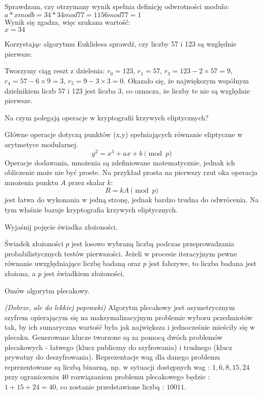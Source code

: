 \documentclass[answers,11pt]{exam}
\newcommand{\fixit}{\textit{(Dobrze, ale do lekkiej poprawki)} }
\begin{document}
\begin{questions}
\begin{solution}
Sprawdzam, czy otrzymany wynik spełnia definicję odwrotności modulo:\\
$a * x mod b = 34 * 34 mod 77 = 1156 mod 77 = 1$\\

Wynik się zgadza, więc szukana wartość:\\
$x = 34$
\end{solution}

\question Korzystając algorytmu Euklidesa sprawdź, czy liczby 57 i 123 są względnie pierwsze.
\begin{solution}
Tworzymy ciąg reszt z dzielenia:
$r_0 = 123$, $r_1 = 57$, $r_3 = 123 - 2 \times 57 = 9$, $r_4 = 57 - 6 \times 9 = 3$, 
$r_5 = 9 - 3 \times 3 = 0$. Okazało się, że największym wspólnym dzielnikiem liczb 57 i 123 jest liczba 3, co oznacza, że liczby te nie są względnie pierwsze.
\end{solution}

\question Na czym polegają operacje w kryptografii krzywych eliptycznych?
\begin{solution}
Główne operacje dotyczą punktów (x,y) spełniających równanie eliptyczne w arytmetyce modularnej. 
\begin{equation}
y^2 = x^3 + ax +b \pmod{p}
\end{equation}
Operacje dodawania, mnożenia są zdefiniowane matematycznie, jednak ich obliczenie może nie być proste. Na przykład prosta na pierwszy rzut oka operacja mnożenia punktu $A$ przez skalar $k$:
\begin{equation}
R = k A \pmod{p}
\end{equation}
jest łatwa do wykonania w jedną stronę, jednak bardzo trudna do odwrócenia. Na tym właśnie bazuje kryptografia krzywych eliptycznych.

\end{solution}

\question Wyjaśnij pojęcie świadka złożoności.
\begin{solution}
Świadek złożoności $p$ jest losowo wybraną liczbą podczas
przeprowadzania probabilistycznych testów pierwszości. Jeżeli w
procesie iteracyjnym pewne równanie uwzględniające liczbę badaną oraz
$p$ jest fałszywe, to liczba badana jest złożona, a $p$ jest świadkiem
złożoności.
\end{solution}

\question Omów algorytm plecakowy.
\begin{solution}
\fixit
Algorytm plecakowy jest asymetrycznym szyfrem opierającym się na maksymalizacyjnym problemie wyboru przedmiotów tak, by ich sumaryczna wartość była jak największa i jednocześnie mieściły się w plecaku. Generowane klucze tworzone są za pomocą dwóch problemów plecakowych - łatwego (klucz publiczny do szyfrowania) i trudnego (klucz prywatny do deszyfrowania). Reprezentacje wag dla danego problemu reprezentowane są liczbą binarną, np. w sytuacji dostępnych wag : $1, 6, 8, 15, 24$ przy ograniczeniu $40$ rozwiązaniem problemu plecakowego będzie : $1+15+24 = 40$, co zostanie przedstawione liczbą : $10011$.
\end{solution}

\end{questions}
\end{document}
